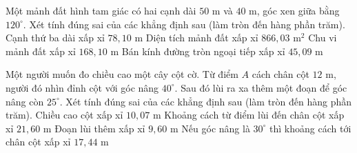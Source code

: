 \begin{ex}%
	Một mảnh đất hình tam giác có hai cạnh dài $50$ m và $40$ m, góc xen giữa bằng $120^\circ$. Xét tính đúng sai của các khẳng định sau (làm tròn đến hàng phần trăm).
	\choiceTF
		{\True Cạnh thứ ba dài xấp xỉ $78{,}10$ m}
		{\True Diện tích mảnh đất xấp xỉ $866{,}03$ m$^2$}
		{Chu vi mảnh đất xấp xỉ $168{,}10$ m}
		{\True Bán kính đường tròn ngoại tiếp xấp xỉ $45{,}09$ m}
\end{ex}

\begin{ex}%
	Một người muốn đo chiều cao một cây cột cờ. Từ điểm $A$ cách chân cột $12$ m, người đó nhìn đỉnh cột với góc nâng $40^\circ$. Sau đó lùi ra xa thêm một đoạn để góc nâng còn $25^\circ$. Xét tính đúng sai của các khẳng định sau (làm tròn đến hàng phần trăm).
	\choiceTF
		{\True Chiều cao cột xấp xỉ $10{,}07$ m}
		{\True Khoảng cách từ điểm lùi đến chân cột xấp xỉ $21{,}60$ m}
		{\True Đoạn lùi thêm xấp xỉ $9{,}60$ m}
		{Nếu góc nâng là $30^\circ$ thì khoảng cách tới chân cột xấp xỉ $17{,}44$ m}
\end{ex}


